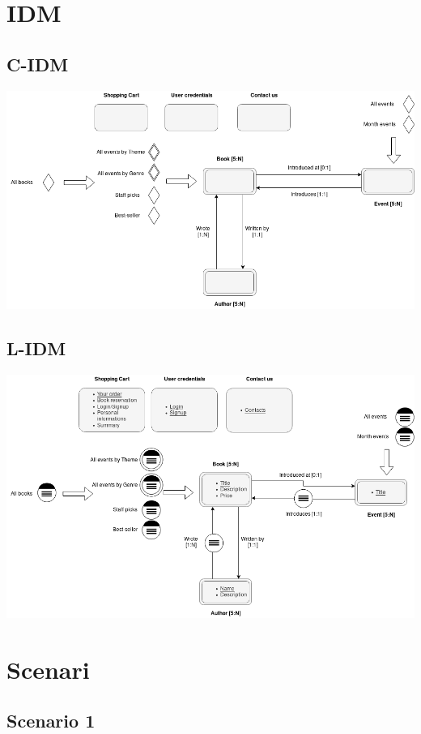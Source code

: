 \documentclass[12pt,a4paper,oneside]{report}
\begin{document}
\chapter{IDM}
\section{C-IDM}

\includegraphics[width=1\textwidth]{cidm}
\section{L-IDM}

\includegraphics[width=1\textwidth]{lidm}

\newpage

\chapter{Scenari}

\section {Scenario 1}
\end{document}
